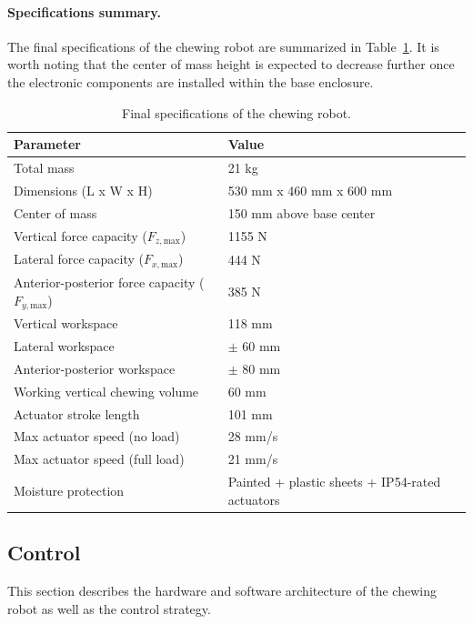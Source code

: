 \paragraph{Specifications summary.}The final specifications of the chewing robot are summarized in Table~\ref{tab:final_specs}. It is worth noting that 
the center of mass height is expected to decrease further once the electronic components are installed within the base enclosure.

\begin{table}[H]
\centering
\begin{tabular}{ l l }
\toprule
\textbf{Parameter} & \textbf{Value} \\
\midrule
Total mass & 21 kg \\
Dimensions (L x W x H) & 530 mm x 460 mm x 600 mm \\
Center of mass & 150 mm above base center \\
Vertical force capacity ($F_{z,\mathrm{max}}$) & 1155 N \\
Lateral force capacity ($F_{x,\mathrm{max}}$) & 444 N \\
Anterior-posterior force capacity ($F_{y,\mathrm{max}}$) & 385 N \\
Vertical workspace & 118 mm \\
Lateral workspace & $\pm$ 60 mm \\
Anterior-posterior workspace & $\pm$ 80 mm \\
Working vertical chewing volume & 60 mm \\
Actuator stroke length & 101 mm \\
Max actuator speed (no load) & 28 mm/s \\
Max actuator speed (full load) & 21 mm/s \\
Moisture protection & Painted + plastic sheets + IP54-rated actuators \\
\bottomrule
\end{tabular}
\caption{Final specifications of the chewing robot.}
\label{tab:final_specs}
\end{table}

\subsection{Control}
\label{sec:control}

This section describes the hardware and software architecture of the chewing robot as well as the control strategy.


